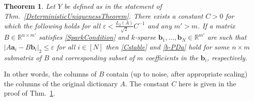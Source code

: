 \documentclass[journal, twocolumn]{IEEEtran}
\newtheorem{theorem}{Theorem}
\begin{document}
\begin{theorem}\label{DeterministicUniquenessTheorem2}
Let $Y$ be defined as in the statement of Thm.~\ref{DeterministicUniquenessTheorem}. There exists a constant $C > 0$ for which the following holds for all $\varepsilon < \frac{L_2(A)}{\sqrt{2}}C^{-1}$ and any $m' > m$. If a matrix $B \in \mathbb{R}^{n \times m'}$ satisfies \eqref{SparkCondition} and $k$-sparse $\mathbf{b}_1, \ldots, \mathbf{b}_N \in \mathbb{R}^{m'}$ are such that \mbox{$|A\mathbf{a}_i - B\mathbf{b}_i|_2 \leq \varepsilon$} for all $i \in [N]$ then \eqref{Cstable} and \eqref{b-PDa} hold for some $n \times m$ submatrix of $B$ and corresponding subset of $m$ coefficients in the $\mathbf{b}_i$, respectively. 
\end{theorem}

In other words, the columns of $B$ contain (up to noise, after appropriate scaling) the columns of the original dictionary $A$. 
The constant $C$ here is given in the proof of Thm.~\ref{DeterministicUniquenessTheorem2}. 


\vspace{-.08 cm}
\end{document}
